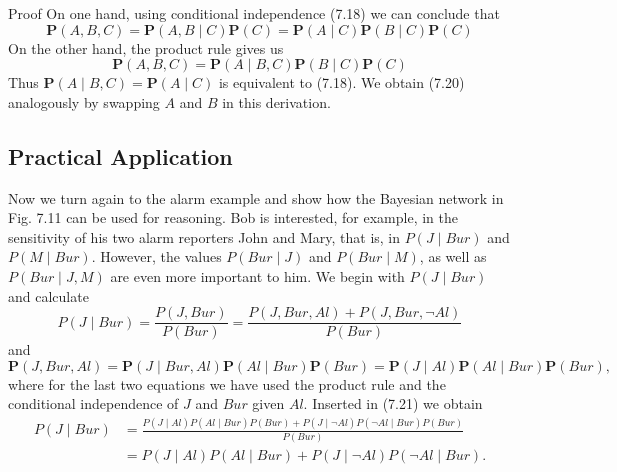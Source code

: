 \documentclass[10pt]{book}
\begin{document}
Proof On one hand, using conditional independence (7.18) we can conclude that
$$
\boldsymbol{P}(A, B, C)=\boldsymbol{P}(A, B \mid C) \boldsymbol{P}(C)=\boldsymbol{P}(A \mid C) \boldsymbol{P}(B \mid C) \boldsymbol{P}(C)
$$
On the other hand, the product rule gives us
$$
\boldsymbol{P}(A, B, C)=\boldsymbol{P}(A \mid B, C) \boldsymbol{P}(B \mid C) \boldsymbol{P}(C)
$$
Thus $\boldsymbol{P}(A \mid B, C)=\boldsymbol{P}(A \mid C)$ is equivalent to (7.18). We obtain (7.20) analogously by swapping $A$ and $B$ in this derivation.

\subsection{Practical Application}
Now we turn again to the alarm example and show how the Bayesian network in Fig. 7.11 can be used for reasoning. Bob is interested, for example, in the sensitivity of his two alarm reporters John and Mary, that is, in $P(J \mid Bur)$ and $P(M \mid Bur)$. However, the values $P(Bur \mid J)$ and $P(Bur \mid M)$, as well as $P(Bur \mid J, M)$ are even more important to him. We begin with $P(J \mid Bur)$ and calculate
\begin{equation*}
P(J \mid Bur)=\frac{P(J, Bur)}{P(Bur)}=\frac{P(J, Bur, Al)+P(J, Bur, \neg Al)}{P(Bur)} \tag{7.21}
\end{equation*}
and
\begin{equation*}
\boldsymbol{P}(J, Bur, Al)=\boldsymbol{P}(J \mid Bur, Al) \boldsymbol{P}(Al \mid Bur) \boldsymbol{P}(Bur)=\boldsymbol{P}(J \mid Al) \boldsymbol{P}(Al \mid Bur) \boldsymbol{P}(Bur), \tag{7.22}
\end{equation*}
where for the last two equations we have used the product rule and the conditional independence of $J$ and $Bur$ given $Al$. Inserted in (7.21) we obtain
\begin{align*}
P(J \mid Bur) & =\frac{P(J \mid Al) P(Al \mid Bur) P(Bur)+P(J \mid \neg Al) P(\neg Al \mid Bur) P(Bur)}{P(Bur)}  \tag{7.23}\\
& =P(J \mid Al) P(Al \mid Bur)+P(J \mid \neg Al) P(\neg Al \mid Bur) .
\end{align*}
\end{document}
